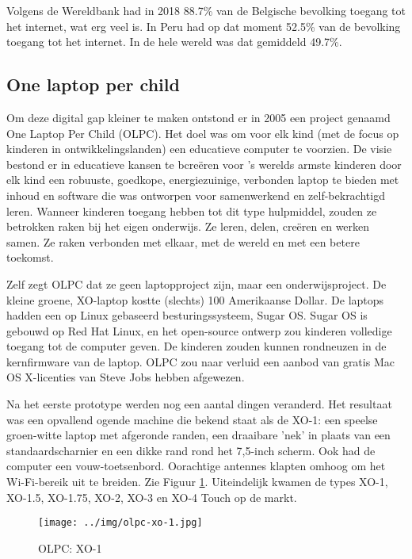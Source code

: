 Volgens de Wereldbank had in 2018 88.7\% van de Belgische bevolking toegang tot het internet, wat erg veel is. In Peru had op dat moment 52.5\% van de bevolking toegang tot het internet. In de hele wereld was dat gemiddeld 49.7\%. \autocite{WereldBank2018}

\subsection{One laptop per child}
Om deze digital gap kleiner te maken ontstond er in 2005 een project genaamd One Laptop Per Child (OLPC). Het doel was om voor elk kind (met de focus op kinderen in ontwikkelingslanden) een educatieve computer te voorzien. De visie bestond er in educatieve kansen te bcreëren voor 's werelds armste kinderen door elk kind een robuuste, goedkope, energiezuinige, verbonden laptop te bieden met inhoud en software die was ontworpen voor samenwerkend en zelf-bekrachtigd leren. Wanneer kinderen toegang hebben tot dit type hulpmiddel, zouden ze betrokken raken bij het eigen onderwijs. Ze leren, delen, creëren en werken samen. Ze raken verbonden met elkaar, met de wereld en met een betere toekomst. \autocite{OneLaptopPerChild2005}

Zelf zegt OLPC dat ze geen laptopproject zijn, maar een onderwijsproject. De kleine groene, XO-laptop kostte (slechts) 100 Amerikaanse Dollar. De laptops hadden een op Linux gebaseerd besturingssysteem, Sugar OS. Sugar OS is gebouwd op Red Hat Linux, en het open-source ontwerp zou kinderen volledige toegang tot de computer geven. De kinderen zouden kunnen rondneuzen in de kernfirmware van de laptop. OLPC zou naar verluid een aanbod van gratis Mac OS X-licenties van Steve Jobs hebben afgewezen. \autocite{Robertson2018}

Na het eerste prototype werden nog een aantal dingen veranderd. Het resultaat was een opvallend ogende machine die bekend staat als de XO-1: een speelse groen-witte laptop met afgeronde randen, een draaibare 'nek' in plaats van een standaardscharnier en een dikke rand rond het 7,5-inch scherm. Ook had de computer een vouw-toetsenbord. Oorachtige antennes klapten omhoog om het Wi-Fi-bereik uit te breiden. Zie Figuur \ref{xo-1}. \autocite{Robertson2018} Uiteindelijk kwamen de types XO-1, XO-1.5, XO-1.75, XO-2, XO-3 en XO-4 Touch op de markt. \autocite{OLPC2016}

 \begin{figure}[h!]
	\texttt{[image: ../img/olpc-xo-1.jpg]}
	\caption{OLPC: XO-1} \autocite{OneLaptopPerChild2005}
	\label{xo-1}
\end{figure}

